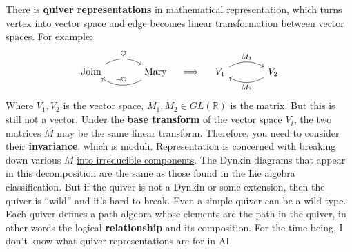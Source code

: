 \documentclass[12pt, orivec]{article}
\begin{document}
\begin{tcolorbox}[breakable, parbox=false]
There is \textbf{quiver representations} in mathematical representation, which turns vertex into vector space and edge becomes linear transformation between vector spaces. For example:\begin{equation}
\begin{tikzcd}[column sep = large]
\mbox{John} \arrow[r, bend left, "\heartsuit"] & \arrow[l, bend left, swap, "\neg \heartsuit"] \mbox{Mary}
\end{tikzcd}
\quad \Longrightarrow \quad
\begin{tikzcd}[column sep = large]
V_1 \arrow[r, bend left, "M_1"] & \arrow[l, bend left, "M_2"] V_2
\end{tikzcd}
\end{equation}
Where $V_1, V_2$ is the vector space, $M_1, M_2 \in GL(\mathbb{R})$ is the matrix. But this is still not a vector.
Under the \textbf{base transform} of the vector space $V_i$, the two matrices $M$ may be the same linear transform. Therefore, you need to consider their \textbf{invariance}, which is moduli. Representation is concerned with breaking down various $M$ \uline{ into irreducible components}. The Dynkin diagrams that appear in this decomposition are the same as those found in the Lie algebra classification. But if the quiver is not a Dynkin or some extension, then the quiver is ``wild'' and it's hard to break. Even a simple quiver can be a wild type.
Each quiver defines a path algebra whose elements are the path in the quiver, in other words the logical \textbf{relationship} and its composition. For the time being, I don't know what quiver representations are for in AI.\end{tcolorbox}
\end{document}
